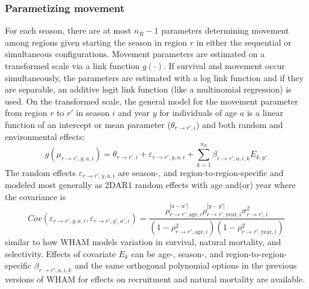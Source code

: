 \documentclass[
]{article}
\begin{document}
\hypertarget{parametizing-movement}{%
\subsubsection*{Parametizing movement}\label{parametizing-movement}}

For each season, there are at most \(n_R-1\) parameters determining
movement among regions given starting the season in region \(r\) in
either the sequential or simultaneous configurations. Movement
parameters are estimated on a transformed scale via a link function
\(g(\cdot)\). If survival and movement occur simultaneously, the
parameters are estimated with a log link function and if they are
separable, an additive logit link function (like a multinomial
regression) is used. On the transformed scale, the general model for the
movement parameter from region \(r\) to \(r'\) in season \(i\) and year
\(y\) for individuals of age \(a\) is a linear function of an intercept
or mean parameter (\(\theta_{r\rightarrow r',i}\)) and both random and
environmental effects: \begin{equation*}
  g(\mu_{r\rightarrow r',y,a,i}) = \theta_{r\rightarrow r',i} + \varepsilon_{r\rightarrow r',y,a,i} + \sum^{n_E}_{k=1} \beta_{r \rightarrow r',a,i,k} E_{k,y}.
\end{equation*} The random effects
\(\varepsilon_{r\rightarrow r',y,a,i}\) are season-, and
region-to-region-specific and modeled most generally as 2DAR1 random
effects with age and(or) year where the covariance is \begin{equation*}
  Cov\left(\varepsilon_{r\rightarrow r',y,a,i},\varepsilon_{r\rightarrow r',y',a',i}\right) =   \frac{\rho_{r\rightarrow r',\text{age},i}^{|a-a'|}\rho_{r\rightarrow r',\text{year},i}^{|y-y'|}\sigma^2_{r\rightarrow r',i}}{\left(1 -  \rho_{r\rightarrow r',\text{age},i}^2\right)\left(1 - \rho_{r\rightarrow r',\text{year},i}^2\right)}
\end{equation*} similar to how WHAM models variation in survival,
natural mortality, and selectivity. Effects of covariate \(E_k\) can be
age-, season-, and region-to-region-specific
\(\beta_{r\rightarrow r',a,i,k}\) and the same orthogonal polynomial
options in the previous versions of WHAM for effects on recruitment and
natural mortality are available.
\end{document}
